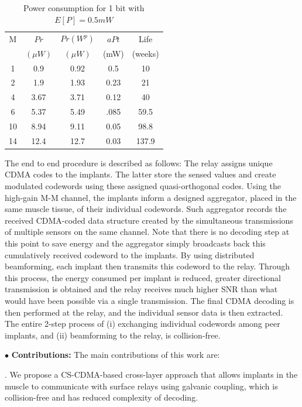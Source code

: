 \begin{table}[h]
\centering
\vspace{2mm}
\caption{\label{tab:result1} Power consumption for 1 bit with $E[P]=0.5mW$}
\vspace{-2mm}
\small
\begin{tabular}{ccccc} 
\toprule
M	& $Pr$ & $Pr(W^p)$	& $aPt$ &	Life\\
	& $(\mu W)$ & $(\mu W)$	& (mW) & (weeks)\\
\midrule
1	& 	0.9	& 	0.92 & 	0.5 	&	10\\
2	&	1.9	&	1.93&	0.23	&	21\\
4	&	3.67	&3.71	&0.12&		40\\
6	&	5.37&	5.49&	.085	&	59.5\\
10	&	8.94&	9.11&	0.05	&	98.8\\
14	&	12.4&	12.7&	0.03	&	137.9\\
\bottomrule
\end{tabular}
\end{table}	 

The end to end procedure is described as follows: The relay assigns unique CDMA codes to the implants. The latter store the sensed values and create modulated codewords using these assigned quasi-orthogonal codes. Using the high-gain M-M channel, the implants inform a designed aggregator, placed in the same muscle tissue, of their individual codewords. Such aggregator records the received CDMA-coded data structure created by the simultaneous transmissions of multiple sensors on the same channel. Note that there is no decoding step at this point to save energy and the aggregator simply broadcasts back this cumulatively received codeword to the implants. By using distributed beamforming, each implant then transmits this codeword to the relay. Through this process, the energy consumed per implant is reduced, greater directional transmission is obtained and the relay receives much higher SNR than what would have been possible via a single transmission. The final CDMA decoding is then performed at the relay, and the individual sensor data is then extracted. The entire 2-step process of (i) exchanging individual codewords among peer implants, and (ii) beamforming to the relay, is collision-free.
  
\noindent $\bullet$ \textbf{Contributions:} The main contributions of this work are:

. We propose a CS-CDMA-based cross-layer approach that allows implants in the muscle to communicate with surface relays using galvanic coupling, which is  collision-free and has reduced complexity of decoding.

